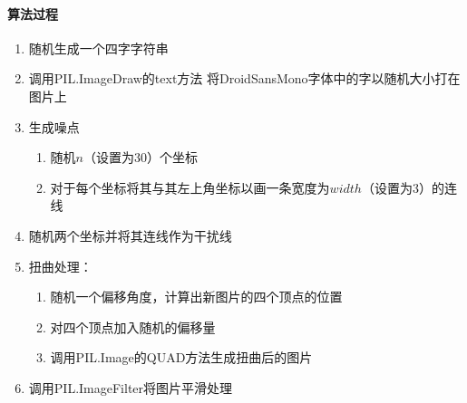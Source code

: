 \documentclass[11pt,UTF8]{article}
\begin{document}
\paragraph{算法过程}
	\begin{enumerate}
	\item 随机生成一个四字字符串
	\item 调用PIL.ImageDraw的text方法 将DroidSansMono字体中的字以随机大小打在图片上
	\item 生成噪点
		\begin{enumerate}
		\item 随机$n$（设置为30）个坐标
		\item 对于每个坐标将其与其左上角坐标以画一条宽度为$width$（设置为3）的连线
		\end{enumerate}
	\item 随机两个坐标并将其连线作为干扰线
	\item 扭曲处理：
		\begin{enumerate}
		\item 随机一个偏移角度，计算出新图片的四个顶点的位置
		\item 对四个顶点加入随机的偏移量
		\item 调用PIL.Image的QUAD方法生成扭曲后的图片
		\end{enumerate}
	\item 调用PIL.ImageFilter将图片平滑处理
	\end{enumerate}
\newpage
\end{document}

